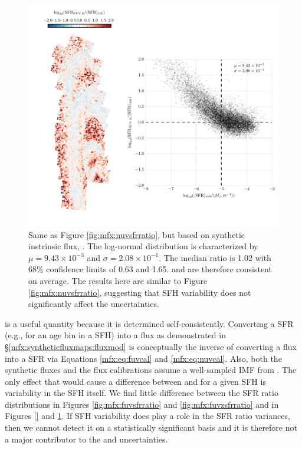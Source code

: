 \begin{figure}
\centering
\includegraphics[width=\textwidth]{m31flux-figures/sfr_nuv0-vs-mean.pdf}
\caption[Ratio of the \sfr{} based on the synthetic intrinsic \nuv{} flux to
the $100\myr$ mean \sfr{}.]{Same as Figure \ref{fig:mfx:nuvsfrratio}, but based
    on synthetic instrinsic flux, \sfrnuvz{}. The log-normal distribution is
    characterized by $\mu = 9.43\times 10^{-3}$ and $\sigma = 2.08\times
    10^{-1}$. The median ratio is 1.02 with 68\% confidence limits of 0.63 and
    1.65. \sfrnuvz{} and \sfroneh{} are therefore consistent on average. The
    results here are similar to Figure \ref{fig:mfx:nuvsfrratio}, suggesting
    that SFH variability does not significantly affect the \sfrnuv{}
    uncertainties.
}
\label{fig:mfx:nuvzsfrratio}
\end{figure}


\sfrxz{} is a useful quantity because it is determined self-consistently.
Converting a SFR (e.g., for an age bin in a SFH) into a flux as demonstrated in
\S \ref{mfx:syntheticfluxmaps:fluxmod} is conceptually the inverse of
converting a flux into a SFR via Equations \ref{mfx:eq:fuvcal} and
\ref{mfx:eq:nuvcal}. Also, both the synthetic fluxes and the flux calibrations
assume a well-sampled IMF from \citet{Kroupa:2001}. The only effect that would
cause a difference between \sfroneh{} and \sfrxz{} for a given SFH is
variability in the SFH itself. We find little difference between the SFR ratio
distributions in Figures \ref{fig:mfx:fuvsfrratio} and
\ref{fig:mfx:fuvzsfrratio} and in Figures \ref{} and
\ref{fig:mfx:nuvzsfrratio}. If SFH variability does play a role in the SFR
ratio variances, then we cannot detect it on a statistically significant basis
and it is therefore not a major contributor to the \sfrx{} and \sfrxz{}
uncertainties.

